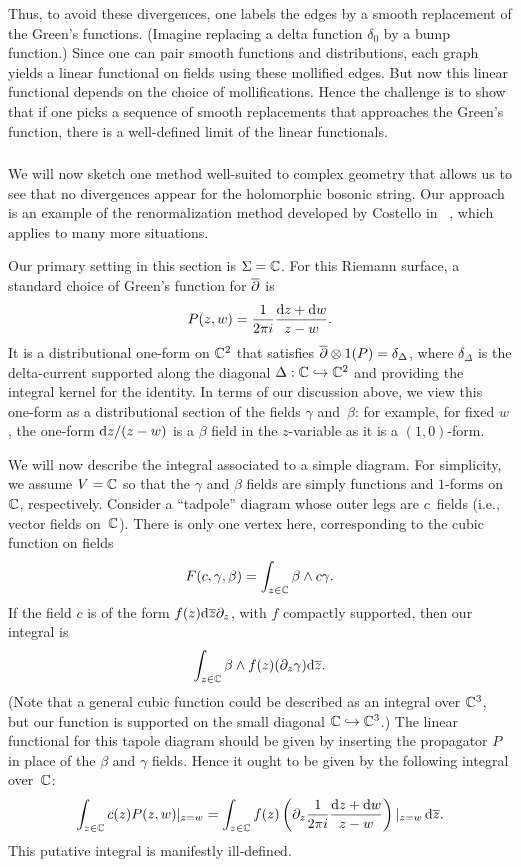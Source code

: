 Thus, to avoid these divergences, one labels the edges by a smooth replacement of the Green's functions. 
(Imagine replacing a delta function $\delta_0$ by a bump function.)
Since one can pair smooth functions and distributions,
each graph yields a linear functional on fields using these mollified edges.
But now this linear functional depends on the choice of mollifications.
Hence the challenge is to show that 
if one picks a sequence of smooth replacements that approaches the Green's function,
there is a well-defined limit of the linear functionals.

\subsubsection{}

We will now sketch one method well-suited to complex geometry
that allows us to see that no divergences appear for the holomorphic bosonic string.
Our approach is an example of the renormalization method developed by Costello in ~\cite{CosBook},
which applies to many more situations.

Our primary setting in this section is $\Sigma=\mathbb C$.
For this Riemann surface, a standard choice of Green's function for $\overline{\partial}$ is
\[
P(z,w) = \frac{1}{2 \pi i} \frac{{\rm d} z + {\rm d} w}{z-w}.
\]
It is a distributional one-form on $\mathbb C^2$ that satisfies $\overline{\partial} \otimes 1(P) = \delta_\Delta$, 
where $\delta_\Delta$ is the delta-current supported along the diagonal $\Delta: \mathbb C \hookrightarrow \mathbb C^2$ and providing the integral kernel for the identity.
In terms of our discussion above,
we view this one-form as a distributional section of the fields $\gamma$ and~$\beta$: 
for example, for fixed $w$, the one-form ${\rm d} z/(z - w)$ is a $\beta$ field in the $z$-variable 
as it is a $(1,0)$-form.

We will now describe the integral associated to a simple diagram.
For simplicity, we assume $V = \mathbb C$ so that the $\gamma$ and $\beta$ fields are simply functions and $1$-forms on $\mathbb C$, respectively.
Consider a ``tadpole'' diagram whose outer legs are $c$~fields 
(i.e., vector fields on~$\mathbb C$).
There is only one vertex here, corresponding to the cubic function on fields
\[
F(c,\gamma,\beta) = \int_{z \in \mathbb C} \beta \wedge c\gamma.
\]
If the field $c$ is of the form $f(z) {\rm d} \overline{z} \partial_z$,
with $f$ compactly supported, 
then our integral is
\[
\int_{z \in \mathbb C} \beta \wedge f(z)(\partial_z\gamma) {\rm d} \overline{z}.
\]
(Note that a general cubic function could be described as an integral over $\mathbb C^3$,
but our function is supported on the small diagonal $\mathbb C \hookrightarrow \mathbb C^3$.)
The linear functional for this tapole diagram should be given by inserting the propagator $P$ in place of the $\beta$ and $\gamma$ fields. 
Hence it ought to be given by the following integral over~$\mathbb C$:
\[
\int_{z \in \mathbb C} c(z)P(z,w)|_{z = w}  
= \int_{z \in \mathbb C} f(z) \left( \partial_z \frac{1}{2 \pi i} \frac{{\rm d} z + {\rm d} w}{z-w}\right)|_{z = w}\, {\rm d} \overline{z}.
\]
This putative integral is manifestly ill-defined.

